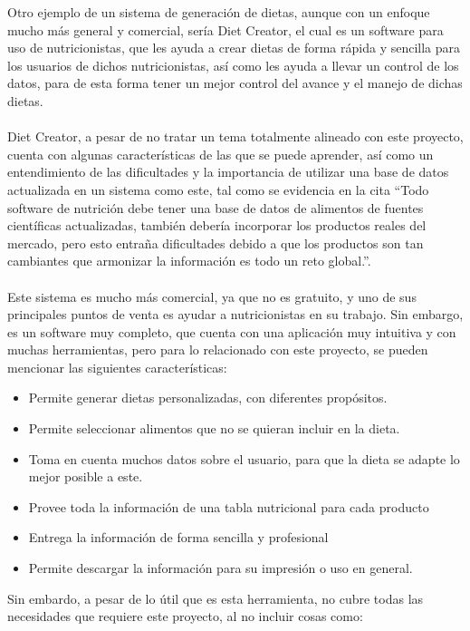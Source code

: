 Otro ejemplo de un sistema de generaci\'on de dietas, aunque con un enfoque mucho m\'as general y comercial, ser\'ia Diet Creator, el cual es un software para uso de nutricionistas, que les ayuda a crear dietas de forma r\'apida y sencilla para los usuarios de dichos nutricionistas, as\'i como les ayuda a llevar un control de los datos, para de esta forma tener un mejor control del avance y el manejo de dichas dietas.
\\
\\
Diet Creator, a pesar de no tratar un tema totalmente alineado con este proyecto, cuenta con algunas caracter\'isticas de las que se puede aprender, as\'i como un entendimiento de las dificultades y la importancia de utilizar una base de datos actualizada en un sistema como este, tal como se evidencia en la cita ``Todo software de nutrici\'on debe tener una base de datos de alimentos de fuentes cient\'ificas actualizadas, tambi\'en deber\'ia incorporar los productos reales del mercado, pero esto entra\~{n}a dificultades debido a que los productos son tan cambiantes que armonizar la informaci\'on es todo un reto global.''\cite{CongresoMundialNutricion}.
\\
\\
Este sistema es mucho m\'as comercial, ya que no es gratuito, y uno de sus principales puntos de venta es ayudar a nutricionistas en su trabajo. Sin embargo, es un software muy completo, que cuenta con una aplicaci\'on  muy intuitiva y con muchas herramientas, pero para lo relacionado con este proyecto, se pueden mencionar las siguientes caracter\'isticas:

\begin{itemize}
    \item Permite generar dietas personalizadas, con diferentes prop\'ositos.
    \item Permite seleccionar alimentos que no se quieran incluir en la dieta.
    \item Toma en cuenta muchos datos sobre el usuario, para que la dieta se adapte lo mejor posible a este.
    \item Provee toda la informaci\'on de una tabla nutricional para cada producto
    \item Entrega la informaci\'on de forma sencilla y profesional
    \item Permite descargar la informaci\'on para su impresi\'on o uso en general.
\end{itemize}

Sin embardo, a pesar de lo \'util que es esta herramienta, no cubre todas las necesidades que requiere este proyecto, al no incluir cosas como:

